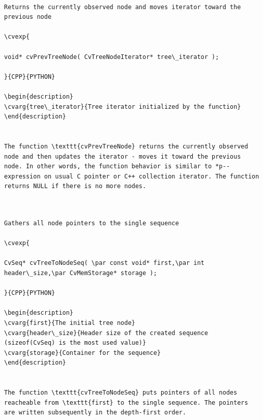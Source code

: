 \begin{verbatim}

Returns the currently observed node and moves iterator toward the previous node

\cvexp{

void* cvPrevTreeNode( CvTreeNodeIterator* tree\_iterator );

}{CPP}{PYTHON}

\begin{description}
\cvarg{tree\_iterator}{Tree iterator initialized by the function}
\end{description}


The function \texttt{cvPrevTreeNode} returns the currently observed node and then updates the iterator - moves it toward the previous node. In other words, the function behavior is similar to *p-- expression on usual C pointer or C++ collection iterator. The function returns NULL if there is no more nodes.


\end{verbatim}
\label{TreeToNodeSeq}
\begin{verbatim}

Gathers all node pointers to the single sequence

\cvexp{

CvSeq* cvTreeToNodeSeq( \par const void* first,\par int header\_size,\par CvMemStorage* storage );

}{CPP}{PYTHON}

\begin{description}
\cvarg{first}{The initial tree node}
\cvarg{header\_size}{Header size of the created sequence (sizeof(CvSeq) is the most used value)}
\cvarg{storage}{Container for the sequence}
\end{description}


The function \texttt{cvTreeToNodeSeq} puts pointers of all nodes reacheable from \texttt{first} to the single sequence. The pointers are written subsequently in the depth-first order.


\end{verbatim}
\label{InsertNodeIntoTree}
